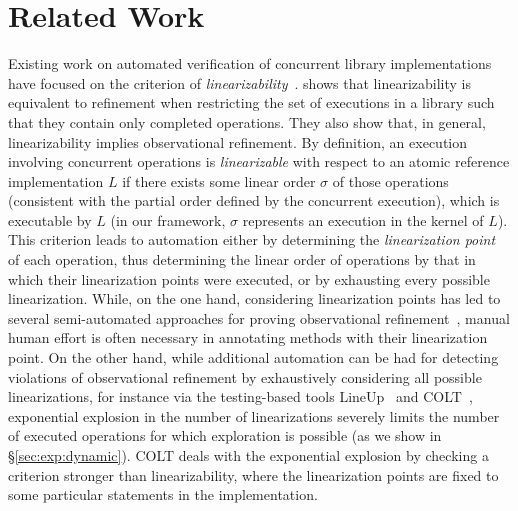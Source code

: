 \section{Related Work}
\label{sec:related}


Existing work on automated verification of concurrent library implementations
have focused on the criterion of
\emph{linearizability}~\citep{journals/toplas/HerlihyW90}. 
\citet{journals/tcs/FilipovicORY10}
shows that linearizability is equivalent to refinement when restricting the set of executions in a library
such that they contain only completed operations. They also show that, in general, linearizability implies
observational refinement. 
By definition, an execution
involving concurrent operations is \emph{linearizable} with respect to an
atomic reference implementation $L$ if there exists some linear order $\sigma$ of
those operations (consistent with the partial order defined by the concurrent execution), 
which is executable by $L$ (in our framework, $\sigma$ represents an execution in
the kernel of $L$). 
This criterion leads to automation
either by determining the \emph{linearization
point}~\citep{journals/toplas/HerlihyW90} of each operation, 
thus determining the linear order of operations by that in which their linearization points were
executed, or by exhausting every possible linearization. While, on the one
hand, considering linearization points has led to several semi-automated
approaches for proving observational refinement~\citep{DBLP:conf/cav/AmitRRSY07,conf/fm/LiuCLS09, conf/podc/OHearnRVYY10,
conf/cav/Vafeiadis10, conf/icse/Zhang11a, conf/pldi/LiangF13,
conf/cav/DragoiGH13}, manual human effort is often necessary in annotating
methods with their linearization point. On the other hand, while additional
automation can be had for detecting violations of observational refinement 
by exhaustively considering all possible linearizations,
for instance via the testing-based tools LineUp~\citep{conf/pldi/BurckhardtDMT10} and 
COLT~\citep{DBLP:conf/oopsla/ShachamBASVY11}, exponential
explosion in the number of linearizations severely limits the number of
executed operations for which exploration is possible (as we show in \S\ref{sec:exp:dynamic}). 
COLT deals with the exponential explosion by checking a criterion stronger than linearizability, 
where the linearization points are fixed to some particular statements in the implementation.

